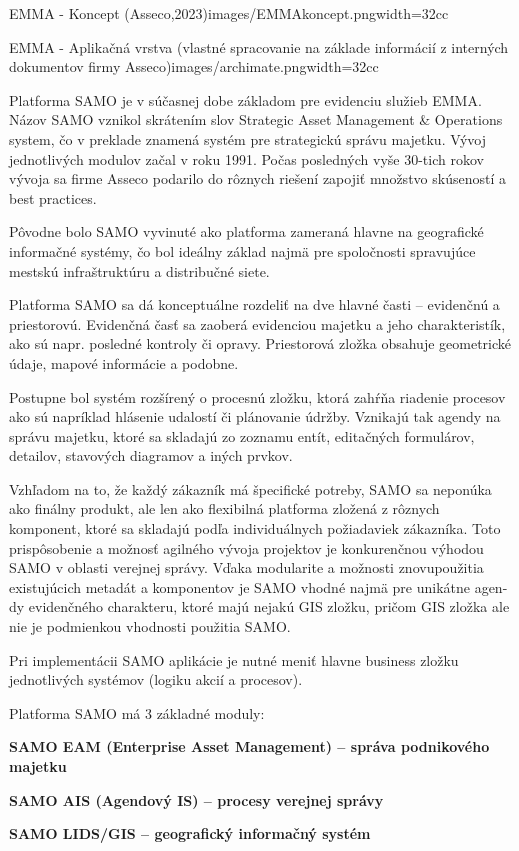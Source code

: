 {EMMA - Koncept (Asseco,2023)}{images/EMMAkoncept.png}{width=32cc}

{EMMA - Aplikačná vrstva (vlastné spracovanie na základe informácií z interných dokumentov firmy Asseco)}{images/archimate.png}{width=32cc}


Platforma SAMO je v súčasnej dobe základom pre evidenciu služieb EMMA. Názov SAMO vznikol skrátením slov Strategic Asset Management \& Operations system, čo v preklade znamená systém pre strategickú správu majetku. Vývoj jednotlivých modulov začal v roku 1991. Počas posledných vyše 30-tich rokov vývoja sa firme Asseco podarilo do rôznych riešení zapojiť množstvo skúseností a best practices.

Pôvodne bolo SAMO vyvinuté ako platforma zameraná hlavne na geografické informačné systémy, čo bol ideálny základ najmä pre spoločnosti spravujúce mestskú infraštruktúru a distribučné siete.

Platforma SAMO sa dá konceptuálne rozdeliť na dve hlavné časti – evidenčnú a priestorovú. Evidenčná časť sa zaoberá evidenciou majetku a jeho charakteristík, ako sú napr. posledné kontroly či opravy. Priestorová zložka obsahuje geometrické údaje, mapové informácie a podobne.

Postupne bol systém rozšírený o procesnú zložku, ktorá zahŕňa riadenie procesov ako sú napríklad hlásenie udalostí či plánovanie údržby. Vznikajú tak agendy na správu majetku, ktoré sa skladajú zo zoznamu entít, editačných formulárov, detailov, stavových diagramov a iných prvkov. 

Vzhľadom na to, že každý zákazník má špecifické potreby, SAMO sa neponúka ako finálny produkt, ale len ako flexibilná platforma zložená z rôznych komponent, ktoré sa skladajú podľa individuálnych požiadaviek zákazníka. Toto prispôsobenie a možnosť agilného vývoja projektov je konkurenčnou výhodou SAMO v oblasti verejnej správy. Vďaka modularite a možnosti znovupoužitia existujúcich metadát a komponentov je SAMO vhodné najmä pre unikátne agen-dy evidenčného charakteru, ktoré majú nejakú GIS zložku, pričom GIS zložka ale nie je podmienkou vhodnosti použitia SAMO. 

Pri implementácii SAMO aplikácie je nutné meniť hlavne business zložku jednotlivých systémov (logiku akcií a procesov).

Platforma SAMO má 3 základné moduly:

\startitemize
\item \start\bf SAMO EAM \stop (Enterprise Asset Management) --  správa podnikového majetku
\item \start\bf SAMO AIS \stop (Agendový IS) -- procesy verejnej správy
\item  \start\bf SAMO LIDS/GIS \stop -- geografický informačný systém
\stopitemize

